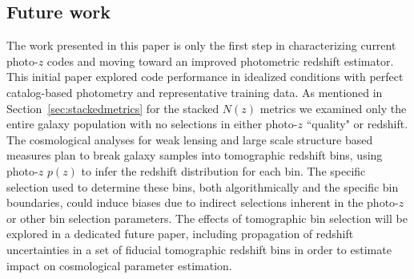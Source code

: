 \subsection{Future work}
\label{sec:futurework}
The work presented in this paper is only the first step in characterizing current photo-$z$ codes and moving toward an improved photometric redshift estimator.  This initial paper explored code performance in idealized conditions with perfect catalog-based photometry and representative training data.  As mentioned in Section~\ref{sec:stackedmetrics} for the stacked $N(z)$ metrics we examined only the entire galaxy population with no selections in either photo-$z$ ``quality" or redshift.  The cosmological analyses for weak lensing and large scale structure based measures plan to break galaxy samples into tomographic redshift bins, using photo-$z$ $p(z)$ to infer the redshift distribution for each bin.  The specific selection used to determine these bins, both algorithmically and the specific bin boundaries, could induce biases due to indirect selections inherent in the photo-$z$ or other bin selection parameters.  The effects of tomographic bin selection will be explored in a dedicated future paper, including propagation of redshift uncertainties in a set of fiducial tomographic redshift bins in order to estimate impact on cosmological parameter estimation.


